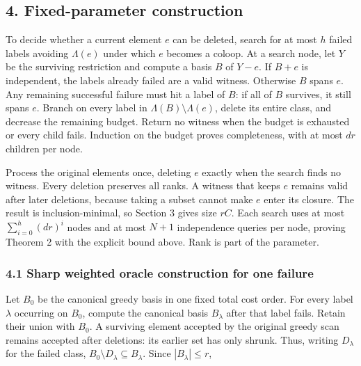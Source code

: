 \hypertarget{af-240b5086c5-fixed-parameter-construction}{%
\subsection{4. Fixed-parameter construction}\label{af-240b5086c5-fixed-parameter-construction}}

To decide whether a current element \(e\) can be deleted, search for at most \(h\) failed labels avoiding \(\Lambda(e)\) under which \(e\) becomes a coloop. At a search node, let \(Y\) be the surviving restriction and compute a basis \(B\) of \(Y-e\). If \(B+e\) is independent, the labels already failed are a valid witness. Otherwise \(B\) spans \(e\). Any remaining successful failure must hit a label of \(B\): if all of \(B\) survives, it still spans \(e\). Branch on every label in \(\Lambda(B)\setminus\Lambda(e)\), delete its entire class, and decrease the remaining budget. Return no witness when the budget is exhausted or every child fails. Induction on the budget proves completeness, with at most \(dr\) children per node.

Process the original elements once, deleting \(e\) exactly when the search finds no witness. Every deletion preserves all ranks. A witness that keeps \(e\) remains valid after later deletions, because taking a subset cannot make \(e\) enter its closure. The result is inclusion-minimal, so Section 3 gives size \(rC\). Each search uses at most \(\sum_{i=0}^{h}(dr)^i\) nodes and at most \(N+1\) independence queries per node, proving Theorem 2 with the explicit bound above. Rank is part of the parameter.

\hypertarget{af-240b5086c5-sharp-weighted-oracle-construction-for-one-failure}{%
\subsubsection{4.1 Sharp weighted oracle construction for one failure}\label{af-240b5086c5-sharp-weighted-oracle-construction-for-one-failure}}

Let \(B_0\) be the canonical greedy basis in one fixed total cost order. For every label \(\lambda\) occurring on \(B_0\), compute the canonical basis \(B_\lambda\) after that label fails. Retain their union with \(B_0\). A surviving element accepted by the original greedy scan remains accepted after deletions: its earlier set has only shrunk. Thus, writing \(D_\lambda\) for the failed class, \(B_0\setminus D_\lambda\subseteq B_\lambda\). Since \(|B_\lambda|\le r\),

